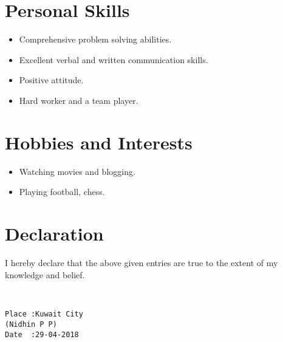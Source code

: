 \documentclass[12pt,a4paper]{moderncv}
\begin{document}

\section{Personal Skills}
	\begin{itemize}
		\item{ Comprehensive problem solving abilities.}
		\item{ Excellent verbal and written communication skills.}
		\item{ Positive attitude.}
		\item{ Hard worker and a team player.}
	\end{itemize}
	


\section{Hobbies and Interests}
	\begin{itemize}
		\item{ Watching movies and blogging.}
		\item{ Playing football, chess.}
	\end{itemize}
			
	
\section{Declaration}

I hereby declare that the above given entries are true to the extent of my knowledge and belief. 
\begin{verbatim}


Place :Kuwait City                                                (Nidhin P P)
Date  :29-04-2018
\end{verbatim}
	
	
\end{document}
